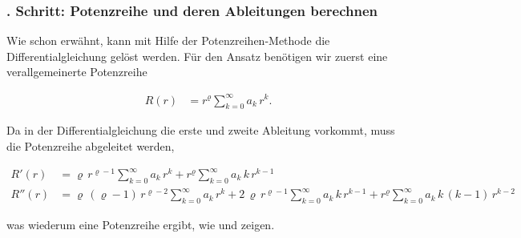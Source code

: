 \subsubsection{. Schritt: Potenzreihe und deren Ableitungen berechnen}
\begin{normalsize}
Wie schon erw\"ahnt,
kann mit Hilfe der Potenzreihen-Methode die Differentialgleichung  gel\"ost werden.
F\"ur den Ansatz ben\"otigen wir zuerst eine verallgemeinerte Potenzreihe
\end{normalsize}
\begin{align}
	R \left( r \right)
	&=
	r^{\varrho}
	\sum_{k=0}^{\infty} a_k \, r^k .
	\label{eq:bessel:potenzreihe:verallgemeinert}
\end{align}
\begin{normalsize}%
Da in der Differentialgleichung die erste und zweite Ableitung vorkommt,
muss die Potenzreihe abgeleitet werden,
\end{normalsize}
\begin{align}
	R'\left( r \right)
	&=
	\varrho \, r^{\varrho - 1}
	\sum_{k=0}^{\infty} a_k \, r^k
	+
	r^{\varrho}
	\sum_{k=0}^{\infty} a_k \, k \, r^{k - 1}
	\label{eq:bessel:potenzreihe:ersteableitung}
\\
	R'' \left( r \right)
	&=
	\varrho \, \left( \varrho - 1 \right) \, r^{\varrho - 2}
	\sum_{k=0}^{\infty} a_k \, r^k
	+
	2 \, \varrho \, r^{\varrho - 1}
	\sum_{k=0}^{\infty} a_k \, k \, r^{k - 1}
	+
	r^{\varrho}
	\sum_{k=0}^{\infty} a_k \, k \, \left( k - 1 \right) \, r^{k - 2}	
	\label{eq:bessel:potenzreihe:zweiteableitung}
\end{align}
\begin{normalsize}%
was wiederum eine Potenzreihe ergibt,
wie  und  zeigen.
\end{normalsize}
